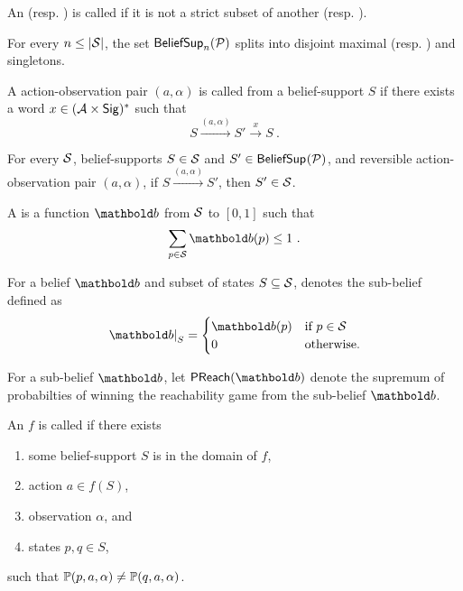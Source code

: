 %
\begin{definition}
An \adscc{} (resp. \aodscc) is called  if it is not a strict subset of another \adscc{} (resp. \aodscc).
\end{definition}
%
\begin{corollary}
For every $n\leq |\st|$, the set $\bsup[n]{\pdp}$ splits into disjoint maximal \adscc{} (resp. \aodscc) and singletons.
\end{corollary}
%
\begin{definition}
A action-observation pair $(a,\alpha)$ is called  from a belief-support $S$ if there exists a word $x\in (\ac\times\sig)^*$ such that
\[
S \xrightarrow{(a,\alpha)} S' \xrightarrow{x} S \ .
\]
\end{definition}
%
\begin{lemma}
For every \aodscc{} $\cS$, belief-supports $S\in \cS$ and $S'\in \bsup{\pdp}$, and reversible action-observation pair $(a,\alpha)$,
if $S \xrightarrow{(a,\alpha)} S'$,
then $S' \in\cS$.
\end{lemma}
%
\begin{definition}
A  is a function $\bel{b}$ from $\st$ to $[0,1]$ such that
\[
\sum_{p\in\st} \bel{b}(p) \leq 1 \ .
\]
\end{definition}
%
\begin{notation}
For a belief $\bel{b}$ and subset of states $S\subseteq \st$,
 denotes the sub-belief defined as
\[
\res{\bel{b}}{S} =
\begin{cases}
\bel{b}(p) & \text{if $p\in\st$} \\
0 & \text{otherwise.}
\end{cases}
\]
\end{notation}
%
\begin{definition}
For a sub-belief $\bel{b}$,
let $\preach(\bel{b})$ denote the supremum of probabilties of winning the reachability game from the sub-belief $\bel{b}$.
\end{definition}
%
\begin{definition}
 An \adscc{} $f$ is called  if there exists
\begin{enumerate}
\item some belief-support $S$ is in the domain of $f$,
\item action $a \in f(S)$,
\item observation $\alpha$, and
\item states $p,q\in S$,
\end{enumerate}
such that $\obpr(p,a,\alpha) \neq \obpr(q,a,\alpha)$. 
\end{definition}
